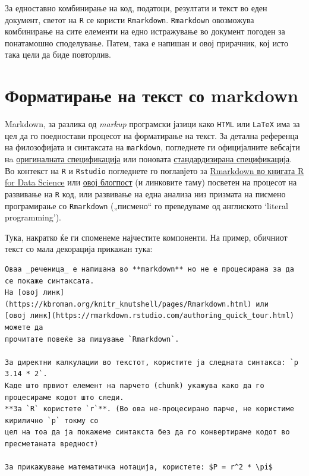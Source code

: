 \documentclass[
]{book}
\begin{document}
За едноставно комбинирање на код, податоци, резултати и текст во еден документ, светот на \texttt{R} се користи \texttt{Rmarkdown}. \texttt{Rmarkdown} овозможува комбинирање на сите елементи на едно истражување во документ погоден за понатамошно споделување. Патем, така е напишан и овој прирачник, кој исто така цели да биде повторлив.

\hypertarget{ux444ux43eux440ux43cux430ux442ux438ux440ux430ux45aux435-ux43dux430-ux442ux435ux43aux441ux442-ux441ux43e-markdown}{%
\section{Форматирање на текст со markdown}\label{ux444ux43eux440ux43cux430ux442ux438ux440ux430ux45aux435-ux43dux430-ux442ux435ux43aux441ux442-ux441ux43e-markdown}}

Markdown, за разлика од \emph{markup} програмски јазици како \texttt{HTML} или \texttt{LaTeX} има за цел да го поедностави процесот на форматирање на текст. За детална референца на филозофијата и синтаксата на \texttt{markdown}, погледнете ги официјалните вебсајти нa \href{https://daringfireball.net/projects/markdown/syntax}{оригиналната спецификација} или поновата \href{https://commonmark.org/}{стандардизирана спецификација}. Во контекст на \texttt{R} и \texttt{Rstudio} погледнете го поглавјето за \href{https://r4ds.had.co.nz/r-markdown.html}{Rmarkdown во книгата R for Data Science} или \href{https://emilyriederer.netlify.app/post/rmarkdown-driven-development/}{овој блогпост} (и линковите таму) посветен на процесот на развивање на \texttt{R} код, или развивање на една анализа низ призмата на писмено програмирање со \texttt{Rmarkdown} („писмено`` го преведуваме од англиското `literal programming').

Тука, накратко ќе ги споменеме најчестите компоненти. На пример, обичниот текст со мала декорација прикажан тука:

\begin{verbatim}
Оваа _реченица_ е напишана во **markdown** но не е процесирана за да се покаже синтаксата. 
На [овој линк](https://kbroman.org/knitr_knutshell/pages/Rmarkdown.html) или 
[овој линк](https://rmarkdown.rstudio.com/authoring_quick_tour.html) можете да 
прочитате повеќе за пишување `Rmarkdown`. 

За директни калкулации во текстот, користите ja следната синтакса: `р 3.14 * 2`. 
Kаде што првиот елемент на парчето (chunk) укажува како да го процесираме кодот што следи. 
**За `R` користете `r`**. (Во ова не-процесирано парче, не користиме кирилично `р` токму со
цел на тоа да ја покажеме синтакста без да го конвертираме кодот во пресметаната вредност)

За прикажување математичка нотација, користете: $P = r^2 * \pi$
\end{verbatim}
\end{document}
